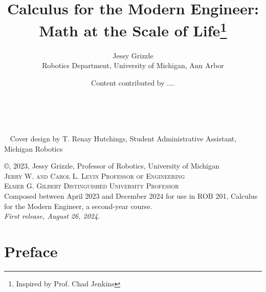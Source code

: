\documentclass[letterpaper]{book}
\title{Calculus for the Modern Engineer: Math at the Scale of Life\thanks{Inspired by Prof. Chad Jenkins}}
\date{}
\author{Jessy Grizzle\\ Robotics Department, University of Michigan, Ann Arbor
\and Content contributed by ....}
\makeatletter
\renewcommand{\frontmatter}{\cleardoublepage\@mainmatterfalse}
\makeatother
\begin{document}

\frontmatter
{} %


\begingroup
\thispagestyle{empty}


\mbox{  }


\endgroup

\clearpage


\begingroup
\thispagestyle{empty}


~\vfill
\thispagestyle{empty}
\noindent Cover design by T. Renay Hutchings, Student Administrative Assistant, Michigan Robotics

\vspace*{2cm}
\noindent\copyright{}, 2023, Jessy Grizzle,  Professor of Robotics, University of Michigan	\\
\noindent \textsc{Jerry W. and Carol L. Levin Professor of Engineering\\
Elmer G. Gilbert Distinguished University Professor}\\


\noindent Composed between April 2023 and December 2024 for use in ROB 201, Calculus for the Modern Engineer, a second-year course.
\\ %

\noindent \textit{First release, August 26, 2024.} %


\endgroup

\frontmatter
\tableofcontents
\chapter{Preface}

\end{document}
